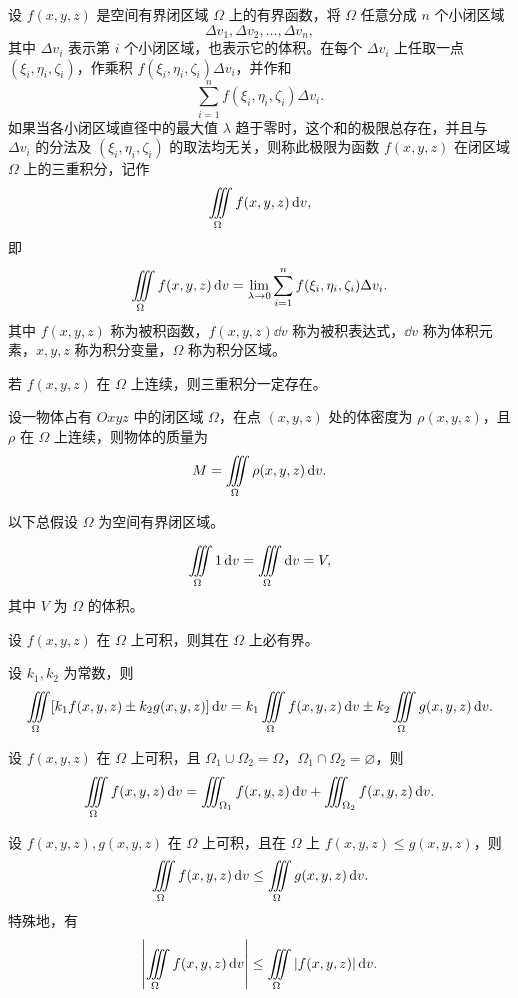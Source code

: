 \clearpage
{}



设 $f(x,y,z)$ 是空间有界闭区域 $\Omega$ 上的有界函数，将 $\Omega$ 任意分成 $n$ 个小闭区域
\[
\Delta v_1,\Delta v_2,\ldots,\Delta v_n,
\]
其中 $\Delta v_i$ 表示第 $i$ 个小闭区域，也表示它的体积。在每个 $\Delta v_i$ 上任取一点
$(\xi_i,\eta_i,\zeta_i)$，作乘积 $f(\xi_i,\eta_i,\zeta_i)\Delta v_i$，并作和
\[
\sum_{i=1}^{n}f(\xi_i,\eta_i,\zeta_i)\Delta v_i.
\]
如果当各小闭区域直径中的最大值 $\lambda$ 趋于零时，这个和的极限总存在，并且与 $\Delta v_i$ 的分法及 $(\xi_i,\eta_i,\zeta_i)$ 的取法均无关，则称此极限为函数 $f(x,y,z)$ 在闭区域 $\Omega$ 上的三重积分，记作
\[
\iiint\limits_{\Omega} f(x,y,z)\mathop{}\!\mathrm d v,
\]
即
\[
\iiint\limits_{\Omega} f(x,y,z)\mathop{}\!\mathrm d v
=\lim_{\lambda\to0}\sum_{i=1}^{n}f(\xi_i,\eta_i,\zeta_i)\Delta v_i.
\]
其中 $f(x,y,z)$ 称为被积函数，$f(x,y,z)\dd v$ 称为被积表达式，$\dd v$ 称为体积元素，$x,y,z$ 称为积分变量，$\Omega$ 称为积分区域。

若 $f(x,y,z)$ 在 $\Omega$ 上连续，则三重积分一定存在。

\begin{notebox}[三重积分的物理意义]
设一物体占有 $Oxyz$ 中的闭区域 $\Omega$，在点 $(x,y,z)$ 处的体密度为 $\rho(x,y,z)$，且 $\rho$ 在 $\Omega$ 上连续，则物体的质量为
\[
M=\iiint\limits_{\Omega}\rho(x,y,z)\mathop{}\!\mathrm d v.
\]
\end{notebox}


以下总假设 $\Omega$ 为空间有界闭区域。

\[
\iiint\limits_{\Omega}1\mathop{}\!\mathrm d v=\iiint\limits_{\Omega}\mathop{}\!\mathrm d v=V,
\]
其中 $V$ 为 $\Omega$ 的体积。

设 $f(x,y,z)$ 在 $\Omega$ 上可积，则其在 $\Omega$ 上必有界。

设 $k_1,k_2$ 为常数，则
\[
\iiint\limits_{\Omega}[k_1f(x,y,z)\pm k_2g(x,y,z)]\mathop{}\!\mathrm d v
=k_1\iiint\limits_{\Omega} f(x,y,z)\mathop{}\!\mathrm d v
\pm k_2\iiint\limits_{\Omega} g(x,y,z)\mathop{}\!\mathrm d v.
\]

设 $f(x,y,z)$ 在 $\Omega$ 上可积，且 $\Omega_1\cup\Omega_2=\Omega$，$\Omega_1\cap\Omega_2=\varnothing$，则
\[
\iiint\limits_{\Omega} f(x,y,z)\mathop{}\!\mathrm d v
=\iiint_{\Omega_1}f(x,y,z)\mathop{}\!\mathrm d v
+\iiint_{\Omega_2}f(x,y,z)\mathop{}\!\mathrm d v.
\]

设 $f(x,y,z),g(x,y,z)$ 在 $\Omega$ 上可积，且在 $\Omega$ 上 $f(x,y,z)\le g(x,y,z)$，则
\[
\iiint\limits_{\Omega} f(x,y,z)\mathop{}\!\mathrm d v\le\iiint\limits_{\Omega} g(x,y,z)\mathop{}\!\mathrm d v.
\]
特殊地，有
\[
\left|\iiint\limits_{\Omega} f(x,y,z)\mathop{}\!\mathrm d v\right|
\le\iiint\limits_{\Omega}|f(x,y,z)|\mathop{}\!\mathrm d v.
\]

